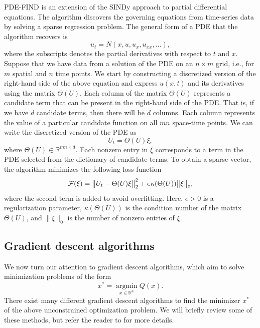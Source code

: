 \documentclass
[
    a4paper,
    DIV=11,
    abstract=true,
    11pt,
]
{scrartcl}
\newcommand{\R}{\mathbb{R}}                                      %
\newcommand{\ts}{\hspace*{0.1em}}                                %
\DeclareMathOperator*{\argmin}{argmin}
\theoremstyle{definition}
\begin{document}
PDE-FIND \cite{rudy2017data} is an extension of the SINDy approach to partial differential equations. The algorithm discovers the governing equations from time-series data by solving a sparse regression problem. The general form of a PDE that the algorithm recovers is
\begin{equation*}
    u_t = N(x, u, u_x, u_{xx}, \dots),
\end{equation*}
where the subscripts denotes the partial derivatives with respect to $ t $ and $ x $. Suppose that we have data from a solution of the PDE on an $n \times m$ grid, i.e., for $m$ spatial and $n$ time points. We start by constructing a discretized version of the right-hand side of the above equation and express $u(x, t)$ and its derivatives using the matrix $\Theta(U)$. Each column of the matrix $\Theta(U)$ represents a candidate term that can be present in the right-hand side of the PDE. That is, if we have $d$ candidate terms, then there will be $d$ columns. Each column represents the value of a particular candidate function on all $mn$ space-time points. We can write the discretized version of the PDE as
\begin{equation*}
    U_t = \Theta(U)\xi,
\end{equation*}
where $\Theta(U) \in \R^{mn \times d}$. Each nonzero entry in $\xi$ corresponds to a term in the PDE selected from the dictionary of candidate terms. To obtain a sparse vector, the algorithm minimizes the following loss function
\begin{equation*}
    \mathcal{F}(\xi) = \big\| U_t - \Theta(U)\xi \big \|_2^2 + \epsilon \ts \kappa(\Theta(U))\big\|\xi\big\|_0,
\end{equation*}
where the second term is added to avoid overfitting. Here, $\epsilon>0$ is a regularization parameter, $ \kappa(\Theta(U)) $ is the condition number of the matrix $ \Theta(U) $, and $\| \xi \|_0$ is the number of nonzero entries of $\xi$.

\subsection{Gradient descent algorithms}

We now turn our attention to gradient descent algorithms, which aim to solve minimization problems of the form
\begin{equation*}
    x^* = \argmin\limits_{x \in \R^n} Q(x).
\end{equation*}
There exist many different gradient descent algorithms to find the minimizer $x^*$ of the above unconstrained optimization problem. We will briefly review some of these methods, but refer the reader to \cite{lu2022gradient, nesterov2018lectures, robbins1951stochastic, tran2024gradient} for more details.
\end{document}

